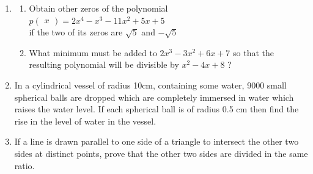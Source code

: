 \documentclass[journal,12pt,twocolumn]{IEEEtran}
\newcommand{\myvec}[1]{\ensuremath{\begin{pmatrix}#1\end{pmatrix}}}
\begin{document}
\begin{enumerate}[label=4.\arabic*]
    \item \begin{enumerate}
        \item  Obtain other zeros of the polynomial\\
    $p \myvec{x} = 2x^4 - x^3 - 11x^2 + 5x + 5$\\
    if the two of its zeros are $\sqrt{5}$ and $- \sqrt{5}$\\
        \item What minimum must be added to $2x^3 - 3x^2 + 6x + 7$ so that the resulting polynomial will be divisible by $x^2 - 4x + 8$ ?\\
    \end{enumerate}
    
    \item In a cylindrical vessel of radius 10cm, containing some water, 9000 small spherical balls are dropped which are completely immersed in water which raises the water level. If each spherical ball is of radius 0.5 cm then find the rise in the level of water in the vessel.\\
    
    \item If a line is drawn parallel to one side of a triangle to intersect the other two sides at distinct points, prove that the other two sides are divided in the same ratio.\\
    
\end{enumerate}
\end{document}
